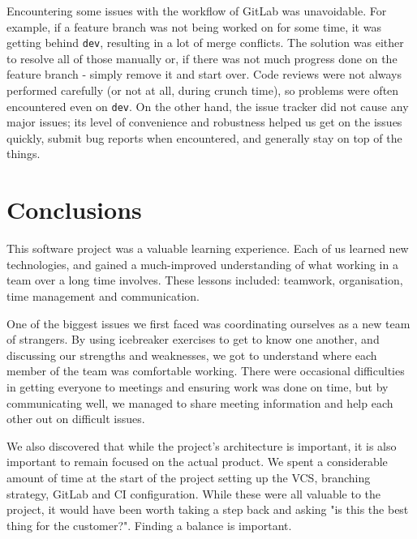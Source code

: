 \documentclass{l3proj}
\begin{document}
Encountering some issues with the workflow of GitLab was unavoidable.
 For example, if a feature branch was not being worked on for some time,
 it was getting behind \texttt{dev}, resulting in a lot of merge conflicts.
 The solution was either to resolve all of those manually or, if
 there was not much progress done on the feature branch - simply remove
 it and start over. Code reviews were not always performed carefully
 (or not at all, during crunch time), so problems were often encountered
 even on \texttt{dev}. On the other hand, the issue tracker did not
 cause any major issues; its level of convenience and robustness helped
 us get on the issues quickly, submit bug reports when encountered,
 and generally stay on top of the things.


\newpage
\section{Conclusions} %
\label{sec:conclusion}


This software project was a valuable learning experience. Each of
 us learned new technologies, and gained a much-improved understanding
 of what working in a team over a long time involves. These lessons
 included: teamwork, organisation, time management and communication.

One of the biggest issues we first faced was coordinating ourselves as a
 new team of strangers. By using icebreaker exercises to get to know
 one another, and discussing our strengths and weaknesses, we got to
 understand where each member of the team was comfortable working. There
 were occasional difficulties in getting everyone to meetings and ensuring
 work was done on time, but by communicating well, we managed to share
 meeting information and help each other out on difficult issues.

We also discovered that while the project's architecture is important,
 it is also important to remain focused on the actual product. We
 spent a considerable amount of time at the start of the project setting
 up the VCS, branching strategy, GitLab and CI configuration. While these
 were all valuable to the project, it would have been worth taking a step
 back and asking "is this the best thing for the customer?". Finding a balance
 is important.
\end{document}
